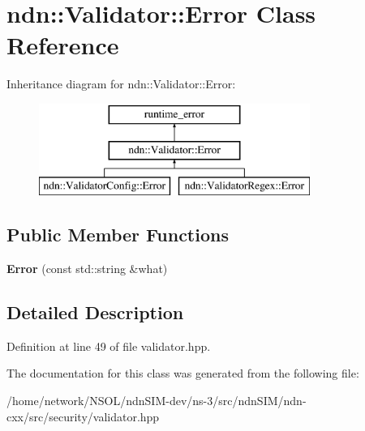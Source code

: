 \hypertarget{classndn_1_1Validator_1_1Error}{}\section{ndn\+:\+:Validator\+:\+:Error Class Reference}
\label{classndn_1_1Validator_1_1Error}
Inheritance diagram for ndn\+:\+:Validator\+:\+:Error\+:\begin{figure}[H]
\begin{center}
\leavevmode
\includegraphics[height=3.000000cm]{classndn_1_1Validator_1_1Error}
\end{center}
\end{figure}
\subsection*{Public Member Functions}
\begin{DoxyCompactItemize}
\item 
{\bfseries Error} (const std\+::string \&what)\hypertarget{classndn_1_1Validator_1_1Error_a0a96011b2d3b434526bb8e02736956c3}{}\label{classndn_1_1Validator_1_1Error_a0a96011b2d3b434526bb8e02736956c3}

\end{DoxyCompactItemize}


\subsection{Detailed Description}


Definition at line 49 of file validator.\+hpp.



The documentation for this class was generated from the following file\+:\begin{DoxyCompactItemize}
\item 
/home/network/\+N\+S\+O\+L/ndn\+S\+I\+M-\/dev/ns-\/3/src/ndn\+S\+I\+M/ndn-\/cxx/src/security/validator.\+hpp\end{DoxyCompactItemize}
